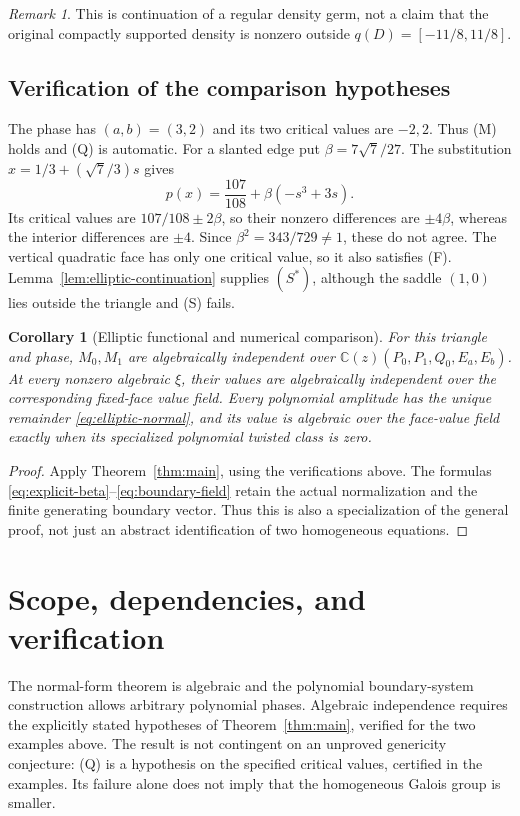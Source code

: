 \documentclass[11pt]{article}
\numberwithin{equation}{section}
\newtheorem{corollary}[corollary]{Corollary}
\theoremstyle{definition}
\theoremstyle{remark}
\newtheorem{remark}[remark]{Remark}
\newcommand{\C}{\mathbb C}
\begin{document}
\begin{remark}
This is continuation of a regular density germ, not a claim that the
original compactly supported density is nonzero outside $q(D)=[-11/8,11/8]$.
\end{remark}

\subsection{Verification of the comparison hypotheses}
The phase has $(a,b)=(3,2)$ and its two critical values are $-2,2$.
Thus (M) holds and (Q) is automatic. For a slanted edge put
$\beta=7\sqrt7/27$. The substitution $x=1/3+(\sqrt7/3)s$ gives
\[
 p(x)=\frac{107}{108}+\beta(-s^3+3s).
\]
Its critical values are $107/108\pm2\beta$, so their nonzero differences
are $\pm4\beta$, whereas the interior differences are $\pm4$.
Since $\beta^2=343/729\ne1$, these do not agree. The vertical quadratic
face has only one critical value, so it also satisfies (F).
Lemma~\ref{lem:elliptic-continuation} supplies $(S^*)$, although the saddle
$(1,0)$ lies outside the triangle and (S) fails.

\begin{corollary}[Elliptic functional and numerical comparison]
\label{thm:intro-elliptic}\label{thm:elliptic-main}\label{thm:values}
For this triangle and phase, $M_0,M_1$ are algebraically independent over
$\C(z)(P_0,P_1,Q_0,E_a,E_b)$. At every nonzero algebraic $\xi$, their values
are algebraically independent over the corresponding fixed-face value
field. Every polynomial amplitude has the unique remainder
\eqref{eq:elliptic-normal}, and its value is algebraic over the face-value
field exactly when its specialized polynomial twisted class is zero.
\end{corollary}
\begin{proof}
Apply Theorem~\ref{thm:main}, using the verifications above. The formulas
\eqref{eq:explicit-beta}--\eqref{eq:boundary-field} retain the actual
normalization and the finite generating boundary vector. Thus this is
also a specialization of the general proof, not just an abstract
identification of two homogeneous equations.
\end{proof}
\section{Scope, dependencies, and verification}\label{sec:scope}
The normal-form theorem is algebraic and the polynomial boundary-system
construction allows arbitrary polynomial phases. Algebraic independence
requires the explicitly stated hypotheses of Theorem~\ref{thm:main},
verified for the two examples above. The result is not contingent on
an unproved genericity conjecture: (Q) is a hypothesis on the specified
critical values, certified in the examples. Its failure alone does not
imply that the homogeneous Galois group is smaller.
\end{document}
